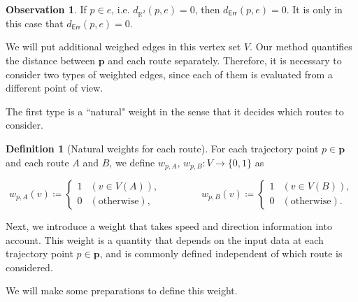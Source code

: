 \documentclass{article}
\numberwithin{equation}{section}
\theoremstyle{definition}
\newtheorem{definition}{Definition}[section]
\newtheorem{observation}[observation]{Observation}
\newcommand{\err}{\mathsf{Err}}
\newcommand{\R}{\mathbb{R}}
\def\:={\coloneqq} %
\begin{document}
\begin{observation}
If $p\in e$, i.e. $d_{\R^2}(p,e)=0$, then $d_\err(p,e)=0$.
It is only in this case that $d_\err(p,e)=0$.
\end{observation}

We will put additional weighed edges in this vertex set $V$.
Our method quantifies the distance between $\mathbf{p}$ and each route separately.
Therefore, it is necessary to consider two types of weighted edges, since each of them is evaluated from a different point of view.

The first type is a ``natural" weight in the sense that it decides which routes to consider.

\begin{definition}[Natural weights for each route] \label{normal-weight}
For each trajectory point $p\in\mathbf{p}$ and each route $A$ and $B$, we define $w_{p,A},\,w_{p,B}:V\to\{0,1\}$ as
\begin{center} \vspace{-6mm}
\[ w_{p,A}(v) \:= \left.
\begin{cases}
1 & (v\in V(A)),   \\
0 & (\text{otherwise}), 
\end{cases}
\right.
\qquad\qquad
w_{p,B}(v) \:=
\begin{cases}
1 & (v\in V(B)),   \\
0 & (\text{otherwise}). 
\end{cases}\]
\end{center} 
\end{definition}

Next, we introduce a weight that takes speed and direction information into account.
This weight is a quantity that depends on the input data at each trajectory point $p\in\mathbf{p}$, and is commonly defined independent of which route is considered.

We will make some preparations to define this weight.
\end{document}
